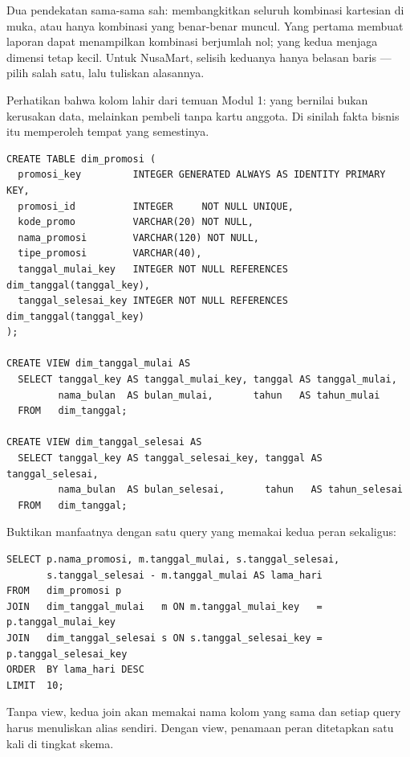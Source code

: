 \begin{catatan}
Dua pendekatan sama-sama sah: membangkitkan seluruh kombinasi kartesian di
muka, atau hanya kombinasi yang benar-benar muncul. Yang pertama membuat
laporan dapat menampilkan kombinasi berjumlah nol; yang kedua menjaga dimensi
tetap kecil. Untuk NusaMart, selisih keduanya hanya belasan baris --- pilih
salah satu, lalu tuliskan alasannya.
\end{catatan}

Perhatikan bahwa kolom  lahir dari temuan Modul 1:
 yang bernilai  bukan kerusakan data,
melainkan pembeli tanpa kartu anggota. Di sinilah fakta bisnis itu memperoleh
tempat yang semestinya.


\begin{lstlisting}[style=sqlgaya]
CREATE TABLE dim_promosi (
  promosi_key         INTEGER GENERATED ALWAYS AS IDENTITY PRIMARY KEY,
  promosi_id          INTEGER     NOT NULL UNIQUE,
  kode_promo          VARCHAR(20) NOT NULL,
  nama_promosi        VARCHAR(120) NOT NULL,
  tipe_promosi        VARCHAR(40),
  tanggal_mulai_key   INTEGER NOT NULL REFERENCES dim_tanggal(tanggal_key),
  tanggal_selesai_key INTEGER NOT NULL REFERENCES dim_tanggal(tanggal_key)
);

CREATE VIEW dim_tanggal_mulai AS
  SELECT tanggal_key AS tanggal_mulai_key, tanggal AS tanggal_mulai,
         nama_bulan  AS bulan_mulai,       tahun   AS tahun_mulai
  FROM   dim_tanggal;

CREATE VIEW dim_tanggal_selesai AS
  SELECT tanggal_key AS tanggal_selesai_key, tanggal AS tanggal_selesai,
         nama_bulan  AS bulan_selesai,       tahun   AS tahun_selesai
  FROM   dim_tanggal;
\end{lstlisting}

Buktikan manfaatnya dengan satu query yang memakai kedua peran sekaligus:

\begin{lstlisting}[style=sqlgaya]
SELECT p.nama_promosi, m.tanggal_mulai, s.tanggal_selesai,
       s.tanggal_selesai - m.tanggal_mulai AS lama_hari
FROM   dim_promosi p
JOIN   dim_tanggal_mulai   m ON m.tanggal_mulai_key   = p.tanggal_mulai_key
JOIN   dim_tanggal_selesai s ON s.tanggal_selesai_key = p.tanggal_selesai_key
ORDER  BY lama_hari DESC
LIMIT  10;
\end{lstlisting}

Tanpa view, kedua join akan memakai nama kolom yang sama dan setiap query harus
menuliskan alias sendiri. Dengan view, penamaan peran ditetapkan satu kali di
tingkat skema.

